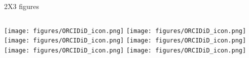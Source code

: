 \documentclass{beamer}
\begin{document}

\begin{frame}{2X3 figures}
    \begin{columns}[t]
        \texttt{[image: figures/ORCIDiD\_icon.png]}
        \texttt{[image: figures/ORCIDiD\_icon.png]}
        \texttt{[image: figures/ORCIDiD\_icon.png]}
        \texttt{[image: figures/ORCIDiD\_icon.png]}
        \texttt{[image: figures/ORCIDiD\_icon.png]}
        \texttt{[image: figures/ORCIDiD\_icon.png]}
    \end{columns}
\end{frame}

\end{document}
